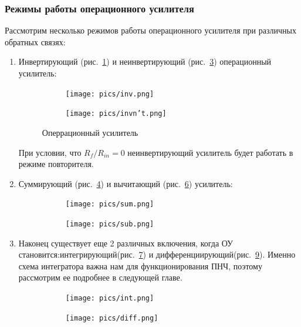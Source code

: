 \documentclass[a4paper,12pt,oneside]{scrartcl}
\begin{document}
\subsubsection{Режимы работы операционного усилителя}\label{sec:modes}
Рассмотрим несколько режимов работы операционного усилителя при различных обратных связях:
\begin{enumerate}
    \item Инвертирующий (рис.~\ref{fig:Inv}) и неинвертирующий (рис.~\ref{fig:Invn't}) операционный усилитель:
    \begin{figure}[!htb]
        \begin{subfigure}[b]{0.45\textwidth}
            \texttt{[image: pics/inv.png]}
            \label{fig:Inv}
        \end{subfigure}
        \begin{subfigure}[b]{0.45\textwidth}
            \texttt{[image: pics/invn't.png]}
            \label{fig:Invn't}
        \end{subfigure}
        \caption{Оперрационный усилитель} 
    \end{figure}
    \FloatBarrier
    При условии, что $R_{f}/R_{in} = 0$ неинвертирующий усилитель будет работать в режиме повторителя.
    
    \item Суммирующий (рис.~\ref{fig:Sum})  и вычитающий (рис.~\ref{fig:Sub}) усилитель:
    \begin{figure}[!htb]
        \begin{subfigure}[b]{0.45\textwidth}
            \texttt{[image: pics/sum.png]}
            \label{fig:Sum}
        \end{subfigure}
        \begin{subfigure}[b]{0.45\textwidth}
            \texttt{[image: pics/sub.png]}
            \label{fig:Sub}
        \end{subfigure}
        \caption{} 
    \end{figure}
    
    \item Наконец существует еще 2 различных включения, когда ОУ становится:интегрирующий(рис.~\ref{fig:Int})  и дифференциирующий(рис.~\ref{fig:Diff}). Именно схема интегратора важна нам для функционирования ПНЧ, поэтому рассмотрим ее подробнее в следующей главе.
    \begin{figure}[!htb]
        \begin{subfigure}[b]{0.45\textwidth}
            \texttt{[image: pics/int.png]}
            \label{fig:Int}
        \end{subfigure}
        \begin{subfigure}[b]{0.45\textwidth}
            \texttt{[image: pics/diff.png]}
            \label{fig:Diff}
        \end{subfigure}
        \caption{} 
    \end{figure}
    \FloatBarrier
\end{enumerate}
\end{document}
